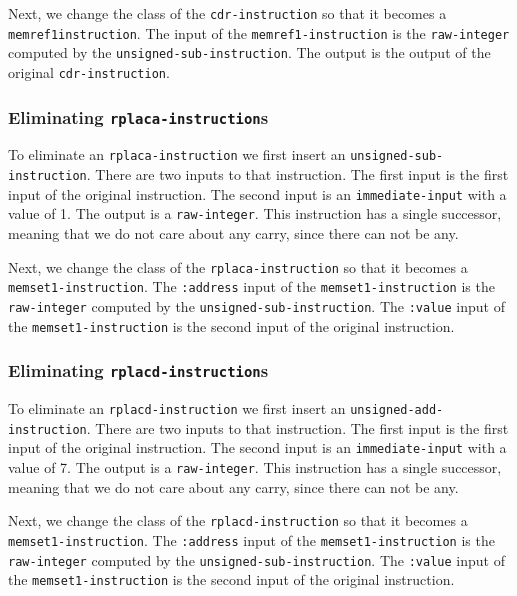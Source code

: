 Next, we change the class of the \texttt{cdr-instruction} so that it
becomes a \texttt{memref1\-instruction}.  The input of the
\texttt{memref1-instruction} is the \texttt{raw-integer} computed by
the \texttt{unsigned-sub-instruction}.  The output is the output of
the original \texttt{cdr-instruction}.

\subsubsection{Eliminating \texttt{rplaca-instruction}s}

To eliminate an \texttt{rplaca-instruction} we first insert an
\texttt{unsigned-sub-instruction}.  There are two inputs to that
instruction.  The first input is the first input of the original
instruction.  The second input is an \texttt{immediate-input} with a
value of 1.  The output is a \texttt{raw-integer}.  This instruction
has a single successor, meaning that we do not care about any carry,
since there can not be any.

Next, we change the class of the \texttt{rplaca-instruction} so that
it becomes a \texttt{memset1-instruction}.  The \texttt{:address}
input of the \texttt{memset1-instruction} is the \texttt{raw-integer}
computed by the \texttt{unsigned-sub-instruction}.  The
\texttt{:value} input of the \texttt{memset1-instruction} is the
second input of the original instruction.

\subsubsection{Eliminating \texttt{rplacd-instruction}s}

To eliminate an \texttt{rplacd-instruction} we first insert an
\texttt{unsigned-add-instruction}.  There are two inputs to that
instruction.  The first input is the first input of the original
instruction.  The second input is an \texttt{immediate-input} with a
value of 7.  The output is a \texttt{raw-integer}.  This instruction
has a single successor, meaning that we do not care about any carry,
since there can not be any.

Next, we change the class of the \texttt{rplacd-instruction} so that
it becomes a \texttt{memset1-instruction}.  The \texttt{:address}
input of the \texttt{memset1-instruction} is the \texttt{raw-integer}
computed by the \texttt{unsigned-sub-instruction}.  The
\texttt{:value} input of the \texttt{memset1-instruction} is the
second input of the original instruction.

